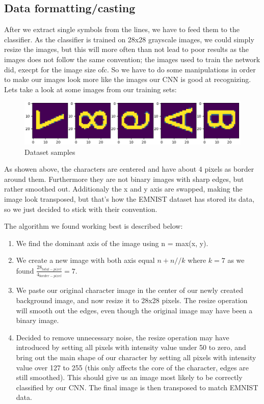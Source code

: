 \documentclass[Report.tex]{subfiles}
\begin{document}
\subsection{Data formatting/casting}\label{subsec:method:Data_formatting}
\begin{flushleft}
After we extract single symbols from the lines, we have to feed them to the classifier. As the classifier is trained on 28x28 grayscale images, we could simply resize the images, but this will more often than not lead to poor results as the images does not follow the same convention; the images used to train the network did, execpt for the image size ofc. So we have to do some manipulations in order to make our images look more like the images our CNN is good at recognizing. Lets take a look at some images from our training sets:

\begin{figure}[H]
  \centering
  \includegraphics[width=\textwidth]{res/dataset_samples}
  \caption{Dataset samples}
  \label{fig:DATASET Samples}
\end{figure}

As showen above, the characters are centered and have about 4 pixels as border around them. Furthermore they are not binary images with sharp edges, but rather smoothed out. Additionaly the x and y axis are swapped, making the image look transposed, but that's how the EMNIST dataset has stored its data, so we just decided to stick with their convention.

The algorithm we found working best is described below: \\
\begin{enumerate}
  \item We find the dominant axis of the image using n = max(x, y).
  \item We create a new image with both axis equal $n + n//k$ where $k = 7$ as we found $\frac{28_{total-pixel}}{4_{border-pixel}} = 7$.
  \item We paste our original character image in the center of our newly created background image, and now resize it to 28x28 pixels. The resize operation will smooth out the edges, even though the original image may have been a binary image.
  \item Decided to remove unnecessary noise, the resize operation may have introduced by setting all pixels with intensity value under 50 to zero, and bring out the main shape of our character by setting all pixels with intensity value over 127 to 255 (this only affects the core of the character, edges are still smoothed). This should give us an image most likely to be correctly classified by our CNN. The final image is then transposed to match EMNIST data.
\end{enumerate}
\end{flushleft}
\end{document}
